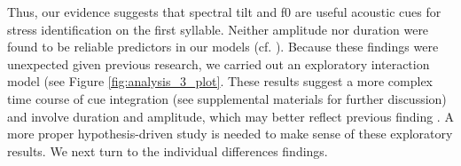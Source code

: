 Thus, our evidence suggests that spectral tilt and f0 are useful acoustic cues for stress identification on the first syllable. Neither amplitude nor duration were found to be reliable predictors in our models (cf. \cite{Alfano2006, Alfano2009, Tagliapietra2005}). Because these findings were unexpected given previous research, we carried out an exploratory interaction model (see Figure \ref{fig:analysis_3_plot}. These results suggest a more complex time course of cue integration (see supplemental materials for further discussion) and involve duration and amplitude, which may better reflect previous finding \cite{Alfano2006, Alfano2009, Tagliapietra2005}. A more proper hypothesis-driven study is needed to make sense of these exploratory results. We next turn to the individual differences findings.



